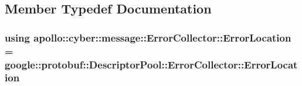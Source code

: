 \subsection{Member Typedef Documentation}
\hypertarget{classapollo_1_1cyber_1_1message_1_1ErrorCollector_ac39eb350844e7897054ed7552e67a64b}{
\subsubsection[{Error\-Location}]{\setlength{\rightskip}{0pt plus 5cm}using {\bf apollo\-::cyber\-::message\-::\-Error\-Collector\-::\-Error\-Location} =  google\-::protobuf\-::\-Descriptor\-Pool\-::\-Error\-Collector\-::\-Error\-Location\hspace{0.3cm}{\ttfamily [private]}}}\label{classapollo_1_1cyber_1_1message_1_1ErrorCollector_ac39eb350844e7897054ed7552e67a64b}


